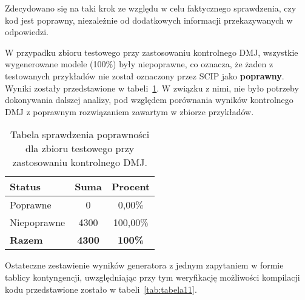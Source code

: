Zdecydowano się na taki krok ze względu w celu faktycznego sprawdzenia, czy kod jest poprawny, niezależnie od dodatkowych informacji przekazywanych w odpowiedzi.


W przypadku zbioru testowego przy zastosowaniu kontrolnego DMJ, wszystkie wygenerowane modele (100\%) były niepoprawne, co oznacza, że żaden z testowanych przykładów nie został oznaczony przez SCIP jako \textbf{poprawny}. Wyniki zostały przedstawione w tabeli~\ref{tab:tabela10}. W związku z nimi, nie było potrzeby dokonywania dalszej analizy, pod względem porównania wyników kontrolnego DMJ z poprawnym rozwiązaniem zawartym w zbiorze przykładów.

\begin{table}[H]
\caption{Tabela sprawdzenia poprawności dla zbioru testowego przy zastosowaniu kontrolnego DMJ.}\label{tab:tabela10}
\centering%
\begin{tabular}{|l|c|c|}
\hline
\textbf{Status} & \textbf{Suma} & \textbf{Procent} \\
\hline
Poprawne & 0 & 0,00\% \\
\hline
Niepoprawne & 4300 & 100,00\% \\
\hline
\textbf{Razem} & \textbf{4300} & \textbf{100\%} \\
\hline
\end{tabular}
\end{table}

Ostateczne zestawienie wyników generatora z jednym zapytaniem w formie tablicy kontyngencji, uwzględniając przy tym weryfikację możliwości kompilacji kodu przedstawione zostało w tabeli~\ref{tab:tabela11}.

